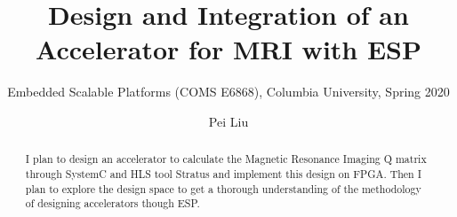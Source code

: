 \documentclass[sigconf, nonacm, screen]{acmart}
\begin{document}
\title{Design and Integration of an Accelerator for MRI with ESP}
\subtitle{Embedded Scalable Platforms (COMS E6868), Columbia University, Spring 2020}

\author{Pei Liu}

\begin{abstract}
I plan to design an accelerator to calculate the Magnetic Resonance Imaging Q
matrix through SystemC and HLS tool Stratus and implement this design on
FPGA. Then I plan to explore the design space to get a thorough understanding of
the methodology of designing accelerators though ESP.
\end{abstract}

\maketitle








\end{document}
